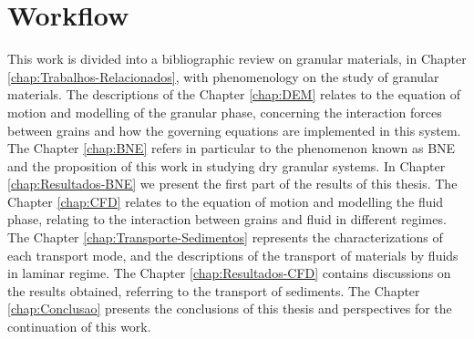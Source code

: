 \section{Workflow}
\label{sec:organizacaoTrabalho}
    This work is divided into a bibliographic review on granular materials, in Chapter \ref{chap:Trabalhos-Relacionados}, with phenomenology on the study of granular materials. The descriptions of the Chapter \ref{chap:DEM} relates to the equation of motion and modelling of the granular phase, concerning the interaction forces between grains and how the governing equations are implemented in this system. The Chapter \ref{chap:BNE} refers in particular to the phenomenon known as BNE and the proposition of this work in studying dry granular systems. In Chapter \ref{chap:Resultados-BNE} we present the first part of the results of this thesis. The Chapter \ref{chap:CFD} relates to the equation of motion and modelling the fluid phase, relating to the interaction between grains and fluid in different regimes. The Chapter \ref{chap:Transporte-Sedimentos} represents the characterizations of each transport mode, and the descriptions of the transport of materials by fluids in laminar regime. The Chapter \ref{chap:Resultados-CFD} contains discussions on the results obtained, referring to the transport of sediments. The Chapter \ref{chap:Conclusao} presents the conclusions of this thesis and perspectives for the continuation of this work.
